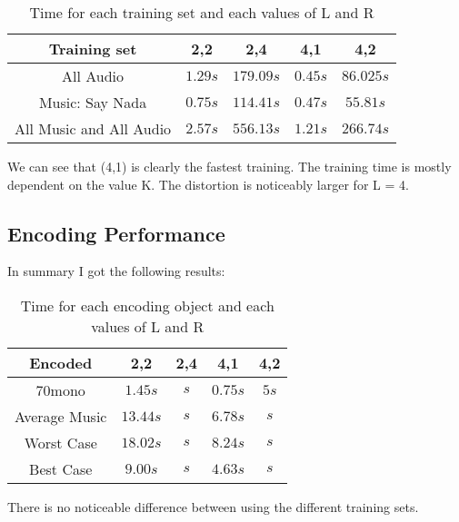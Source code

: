 \documentclass[a4paper, 11pt]{article}
\begin{document}
			\begin{table}[H]
				\centering
				\begin{tabular}{c|c|c|c|c}
					\textbf{Training set}	 	& \textbf{2,2} & \textbf{2,4}	& \textbf{4,1} & \textbf{4,2}\\ \hline
					All Audio 					& $ 1.29 s $ 	& $ 179.09 s $	& $ 0.45 s $ 	& $ 86.02 5 s $	\\ \hline
					Music: Say Nada				& $ 0.75 s $	& $ 114.41 s $	& $ 0.47 s $ 	& $ 55.81 s $	\\ \hline
					All Music and All Audio 	& $ 2.57 s $	& $	556.13 s $	& $ 1.21 s $	& $	266.74 s $	\\
				\end{tabular}
				\caption{Time for each training set and each values of L and R}
				\label{table:TrainTime}
			\end{table}
		
			We can see that (4,1) is clearly the fastest training.
			The training time is mostly dependent on the value K.
			The distortion is noticeably larger for L = 4.
			
		\subsection{Encoding Performance}
			In summary I got the following results:
			
			\begin{table}[H]
				\centering
				\begin{tabular}{c|c|c|c|c}
					\textbf{Encoded}	& \textbf{2,2} 	& \textbf{2,4}	& \textbf{4,1} & \textbf{4,2}\\ \hline
					70mono					& $ 1.45 s $ 	& $  s $	& $ 0.75 s $ 	& $  5 s $	\\ \hline
					Average Music			& $ 13.44 s $	& $  s $	& $ 6.78 s $ 	& $  s $	\\ \hline	
					Worst Case				& $ 18.02 s $	& $	 s $	& $ 8.24 s $	& $	 s $	\\ \hline
					Best Case				& $ 9.00 s $	& $	 s $	& $ 4.63 s $	& $	 s $	\\
				\end{tabular}
				\caption{Time for each encoding object and each values of L and R}
				\label{table:EncodeTime}
			\end{table}
			There is no noticeable difference between using the different training sets.
			
\end{document}
